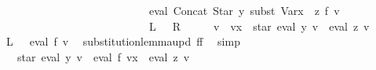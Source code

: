 \begin{isabellebody}
\ \ \ \ \ \ \ \ \ \ \ \ \ \ \ \ \ \ \ \ \ \ \ \ \ \ {\isasymsubseteq}\ {\isasymPsi}\ {\isacharparenleft}{\kern0pt}eval\ {\isacharparenleft}{\kern0pt}Concat\ {\isacharparenleft}{\kern0pt}Star\ y{\isacharparenright}{\kern0pt}\ {\isacharparenleft}{\kern0pt}subst\ {\isacharparenleft}{\kern0pt}Var{\isacharparenleft}{\kern0pt}x\ {\isacharcolon}{\kern0pt}{\isacharequal}{\kern0pt}\ z{\isacharparenright}{\kern0pt}{\isacharparenright}{\kern0pt}\ f{\isacharparenright}{\kern0pt}{\isacharparenright}{\kern0pt}\ v{\isacharparenright}{\kern0pt}{\isachardoublequoteclose}\isanewline
\ \ \ \ \ \ \ \ \ \ \ \ \ \ \ \ \ \ \ \ \ \ \ \ \ \ {\isacharparenleft}{\kern0pt}\ {\isachardoublequoteopen}{\isasymPsi}\ {\isacharquery}{\kern0pt}L\ {\isasymsubseteq}\ {\isasymPsi}\ {\isacharquery}{\kern0pt}R{\isachardoublequoteclose}{\isacharparenright}{\kern0pt}\isanewline
%
\isadelimproof
%
\endisadelimproof
%
\isatagproof
{}\isamarkupfalse%
\ {\isacharminus}{\kern0pt}\isanewline
\ \ \isamarkupfalse%
\ {\isacharquery}{\kern0pt}v{\isacharprime}{\kern0pt}\ {\isacharequal}{\kern0pt}\ {\isachardoublequoteopen}v{\isacharparenleft}{\kern0pt}x\ {\isacharcolon}{\kern0pt}{\isacharequal}{\kern0pt}\ star\ {\isacharparenleft}{\kern0pt}eval\ y\ v{\isacharparenright}{\kern0pt}\ {\isacharat}{\kern0pt}{\isacharat}{\kern0pt}\ eval\ z\ v{\isacharparenright}{\kern0pt}{\isachardoublequoteclose}\isanewline
\ \ \isamarkupfalse%
\ {\isachardoublequoteopen}{\isasymPsi}\ {\isacharquery}{\kern0pt}L\ {\isacharequal}{\kern0pt}\ {\isasymPsi}\ {\isacharparenleft}{\kern0pt}eval\ f\ {\isacharquery}{\kern0pt}v{\isacharprime}{\kern0pt}{\isacharparenright}{\kern0pt}{\isachardoublequoteclose}\ \isamarkupfalse%
\ substitution{\isacharunderscore}{\kern0pt}lemma{\isacharunderscore}{\kern0pt}upd{\isacharbrackleft}{\kern0pt}\ f{\isacharequal}{\kern0pt}f{\isacharbrackright}{\kern0pt}\ \isamarkupfalse%
\ simp\isanewline
\ \ \isamarkupfalse%
\ \isamarkupfalse%
\ {\isachardoublequoteopen}{\isasymdots}\ {\isasymsubseteq}\ {\isasymPsi}\ {\isacharparenleft}{\kern0pt}star\ {\isacharparenleft}{\kern0pt}eval\ y\ v{\isacharparenright}{\kern0pt}\ {\isacharat}{\kern0pt}{\isacharat}{\kern0pt}\ eval\ f\ {\isacharparenleft}{\kern0pt}{\isacharquery}{\kern0pt}v{\isacharprime}{\kern0pt}{\isacharparenleft}{\kern0pt}x\ {\isacharcolon}{\kern0pt}{\isacharequal}{\kern0pt}\ eval\ z\ v{\isacharparenright}{\kern0pt}{\isacharparenright}{\kern0pt}{\isacharparenright}{\kern0pt}{\isachardoublequoteclose}\isanewline

\end{isabellebody}
